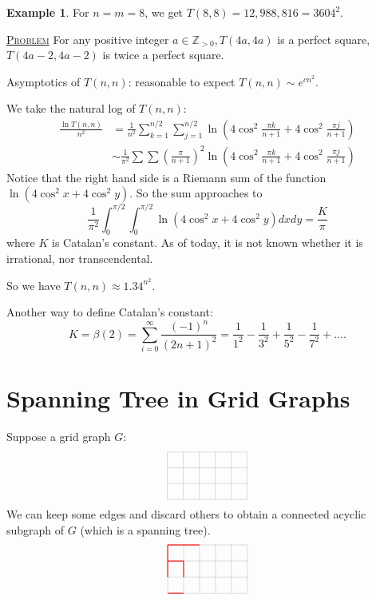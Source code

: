 \documentclass{report}
\newcommand{\Z}{\mathbb{Z}}
\newcommand{\fancyem}[1]{\underline{\textsc{#1}}}
\theoremstyle{definition}
\newtheorem{example}{Example}[section]
\theoremstyle{remark}
\numberwithin{equation}{section}
\begin{document}
\begin{example}
For $n = m = 8$, we get $T(8, 8) = 12,988,816 = 3604^2.$
\end{example}

\fancyem{Problem} For any positive integer $a \in \Z_{>0}, T(4a, 4a)$ is a perfect square, $T(4a - 2, 4a - 2)$ is twice a perfect square.

Asymptotics of $T(n, n)$: reasonable to expect $T(n, n) \sim e^{cn^2}$.

We take the natural log of $T(n, n)$:
\begin{align*}
\frac{\ln T(n, n)}{n^2} & = \frac{1}{n^2}\sum_{k=1}^{n/2}\sum_{j=1}^{n/2} \ln\left(4\cos^2\frac{\pi k}{n+1} + 4\cos^2\frac{\pi j}{n+1}\right) \\
& \sim \frac{1}{\pi^2}\sum\sum \left(\frac{\pi}{n+1}\right)^2 \ln\left(4\cos^2\frac{\pi k}{n+1} + 4\cos^2\frac{\pi j}{n+1}\right)
\end{align*}
Notice that the right hand side is a Riemann sum of the function $\ln(4\cos^2x+4\cos^2y)$. So the sum approaches to 
\[
\frac{1}{\pi^2} \int_0^{\pi/2}\int_0^{\pi/2} \ln(4\cos^2x+4\cos^2y)dxdy = \frac{K}{\pi}
\]
where $K$ is Catalan's constant. As of today, it is not known whether it is irrational, nor transcendental.

So we have $T(n, n) \approx 1.34^{n^2}.$

Another way to define Catalan's constant:
\[
K = \beta(2) = \sum_{i=0}^\infty \frac{(-1)^n}{(2n+1)^2} = \frac{1}{1^2} - \frac{1}{3^2} + \frac{1}{5^2} - \frac{1}{7^2} + \ldots.
\]

\section{Spanning Tree in Grid Graphs}
Suppose a grid graph $G$:
\[\begin{tikzpicture}
\draw[step=0.5cm,gray,very thin] (-1.5, 1) grid (1, -0.5);
\end{tikzpicture}\]
We can keep some edges and discard others to obtain a connected acyclic subgraph of $G$ (which is a spanning tree).
\[\begin{tikzpicture}
\draw[step=0.5cm,gray,very thin] (-1.5, 1) grid (1, -0.5);
\draw[red, thick] (-1.5, 1) -- (-1, 1);
\draw[red, thick] (-1.5, 1) -- (-1.5, 0.5);
\draw[red, thick] (-1, 1) -- (-0.5, 1);
\draw[red, thick] (-1.5, 0.5) -- (-1, 0.5);
\draw[red, thick] (-1.5, 0.5) -- (-1.5, 0);
\draw[red, thick] (-1, 0.5) -- (-1, 0);
\draw[red, thick] (-1.5, -0.5) -- (-1, -0.5);
\end{tikzpicture}\]
\end{document}
